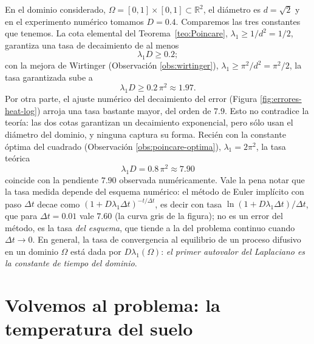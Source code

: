 \documentclass[12pt, a4paper]{amsbook}
\newcommand{\R}{{\mathbb R}}
\theoremstyle{remark}
\theoremstyle{definition}
\numberwithin{section}{chapter}
\numberwithin{subsection}{section}
\numberwithin{equation}{section}
\numberwithin{figure}{chapter}
\begin{document}
En el dominio considerado, $\Omega = [0,1]\times[0,1]\subset\R^2$, el diámetro es $d=\sqrt{2}$ y en el experimento numérico tomamos $D=0.4$. Comparemos las tres constantes que tenemos. La cota elemental del Teorema~\ref{teo:Poincare}, $\lambda_1\ge 1/d^2 = 1/2$, garantiza una tasa de decaimiento de al menos
\[
\lambda_1 D \ge 0.2 ;
\]
con la mejora de Wirtinger (Observación \ref{obs:wirtinger}), $\lambda_1\ge\pi^2/d^2=\pi^2/2$, la tasa garantizada sube a
\[
\lambda_1 D \ge 0.2\,\pi^2 \approx 1.97 .
\]
Por otra parte, el ajuste numérico del decaimiento del error (Figura \ref{fig:errores-heat-log}) arroja una tasa bastante mayor, del orden de $7.9$. Esto no contradice la teoría: las dos cotas garantizan un decaimiento exponencial, pero sólo usan el diámetro del dominio, y ninguna captura su forma. Recién con la constante óptima del cuadrado (Observación \ref{obs:poincare-optima}), $\lambda_1 = 2\pi^2$, la tasa teórica
\[
\lambda_1 D = 0.8\,\pi^2 \approx 7.90
\]
coincide con la pendiente $7.90$ observada numéricamente. Vale la pena notar que la tasa medida depende del esquema numérico: el método de Euler implícito con paso $\Delta t$ decae como $(1+D\lambda_1\Delta t)^{-t/\Delta t}$, es decir con tasa $\ln(1+D\lambda_1\Delta t)/\Delta t$, que para $\Delta t=0.01$ vale $7.60$ (la curva gris de la figura); no es un error del método, es la tasa \emph{del esquema}, que tiende a la del problema continuo cuando $\Delta t\to0$. En general, la tasa de convergencia al equilibrio de un proceso difusivo en un dominio $\Omega$ está dada por $D\lambda_1(\Omega)$: \emph{el primer autovalor del Laplaciano es la constante de tiempo del dominio}.

\section{Volvemos al problema: la temperatura del suelo}\label{sec:volvemos-suelo}
\end{document}
